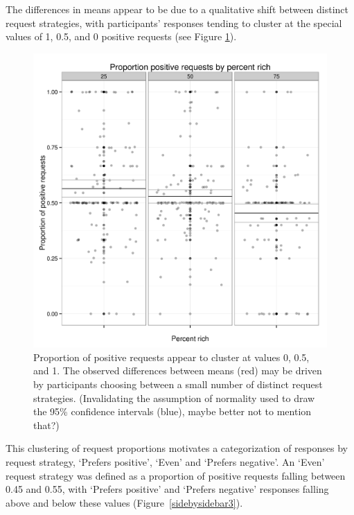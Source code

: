 \documentclass[10pt,letterpaper]{article}
\begin{document}
The differences in means appear to be due to a qualitative shift between distinct request strategies, with participants' responses tending to cluster at the special values of 1, 0.5, and 0 positive requests %
(see Figure \ref{propposdots}).

\begin{figure}[t]
\centering
\includegraphics[width=.5\textwidth]{propposplotlines.png}
\caption{Proportion of positive requests appear to cluster at values 0, 0.5, and 1. The observed differences between means (red) may be driven by participants choosing between a small number of distinct request strategies. (Invalidating the assumption of normality used to draw the 95\% confidence intervals (blue), maybe better not to mention that?)}
\label{propposdots}
\end{figure}

This clustering of request proportions motivates a categorization of responses by request strategy, `Prefers positive', `Even' and `Prefers negative'. An `Even' request strategy was defined as a proportion of positive requests falling between 0.45 and 0.55, with `Prefers positive' and `Prefers negative' responses falling above and below these values (Figure~\ref{sidebysidebar3}).
\end{document}
